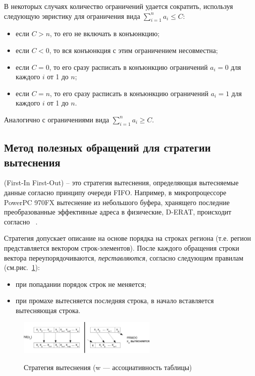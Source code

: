 \begin{enumerate}
В некоторых случаях количество ограничений удается сократить, используя следующую эвристику для ограничения вида $\sum_{i=1}^n a_i \leqslant C$:
\begin{itemize}
    \item если $C > n$, то его не включать в конъюнкцию;
    \item если $C < 0$, то вся конъюнкция с этим ограничением несовместна;
    \item если $C = 0$, то его сразу расписать в конъюнкцию ограничений
$a_i = 0$ для каждого $i$ от 1 до $n$;
    \item если $C = n$, то его сразу расписать в конъюнкцию ограничений
$a_i = 1$ для каждого $i$ от 1 до $n$.
\end{itemize}

Аналогично с ограничениями вида $\sum_{i=1}^n a_i \geqslant C$.


\subsection{Метод полезных обращений для стратегии вытеснения \FIFO}

\FIFO (First-In First-Out) -- это стратегия вытеснения, определяющая
вытесняемые данные согласно принципу очереди FIFO. Например, в
микропроцессоре PowerPC 970FX вытеснение из небольшого буфера,
хранящего последние преобразованные эффективные адреса в физические,
D-ERAT, происходит согласно \FIFO~\cite{PowerPC970FXUserManual}.

Стратегия \FIFO допускает описание на основе порядка на строках
региона (т.е. регион представляется вектором строк-элементов). После каждого
обращения строки вектора переупорядочиваются, \emph{перставляются}, согласно следующим правилам
(см.рис.~\ref{fifo1}):
\begin{itemize}
\item при попадании порядок строк не меняется;
\item при промахе вытесняется последняя строка, в начало вставляется вытесняющая строка.
\end{itemize}

\begin{figure}[h] \center
  \includegraphics[width=0.6\textwidth]{2.theor/fifo1}\\
  \caption{Стратегия вытеснения \FIFO (w --- ассоциативность
таблицы)}\label{fifo1}
\end{figure}


\end{enumerate}
